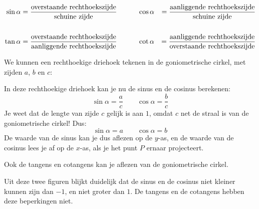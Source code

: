 \begin{align*}
\sin \alpha &= \frac{\textup{overstaande rechthoekszijde}}{\textup{schuine zijde}} &\qquad & \cos \alpha &= \frac{\textup{aanliggende rechthoekszijde}}{\textup{schuine zijde}}\\
&&\\
\tan \alpha &= \frac{\textup{overstaande rechthoekszijde}}{\textup{aanliggende rechthoekszijde}}&\qquad &\cot \alpha &= \frac{\textup{aanliggende rechthoekszijde}}{\textup{overstaande rechthoekszijde}}\\
\end{align*}

We kunnen een rechthoekige driehoek tekenen in de goniometrische cirkel, met zijden $a$, $b$ en $c$:



In deze rechthoekige driehoek kan je nu de sinus en de cosinus berekenen:
\[\sin \alpha = \frac{a}{c} \qquad \cos \alpha = \frac{b}{c}\]
Je weet dat de lengte van zijde $c$ gelijk is aan $1$, omdat $c$ net de straal is van de goniometrische cirkel! Dus:
\[\sin \alpha = a \qquad \cos \alpha = b\]
De waarde van de sinus kan je dus aflezen op de $y$-as, en de waarde van de cosinus lees je af op de $x$-as, als je het punt $P$ ernaar projecteert.



Ook de tangens en cotangens kan je aflezen van de goniometrische cirkel.



Uit deze twee figuren blijkt duidelijk dat de sinus en de cosinus niet kleiner kunnen zijn dan $-1$, en niet groter dan $1$. De tangens en de cotangens hebben deze beperkingen niet.

